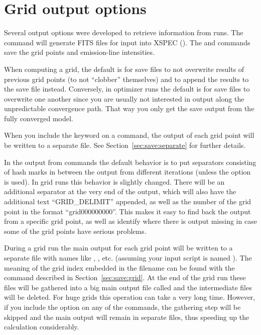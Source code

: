 \section{Grid output options}
\label{sec:GridOutputOptions}

Several  output
options were developed to
retrieve information from  runs.
The  command
will generate FITS files for input into XSPEC (\citealp{Porter2006}).
The
 and  commands
save the grid points and emission-line intensities.

When computing a grid, the default is for save files to not overwrite
results of previous grid points (to not ``clobber'' themselves) and
to append the results to the save file instead.
Conversely, in optimizer runs the default
is for save files to overwrite one another since you
are usually not interested in output along the unpredictable convergence path.
That way you only get the save output from the fully converged model.

When you include the  keyword on a 
command, the output of each grid point will be written to a separate file. See
Section~\ref{sec:save:separate} for further details.

In the output from  commands the default behavior is to put
separators consisting of hash marks in between the output from different
iterations (unless the  option is used). In grid runs this
behavior is slightly changed. There will be an additional separator at the
very end of the output, which will also have the additional text
``GRID\_DELIMIT'' appended, as well as the number of the grid point in the
format ``grid000000000''. This makes it easy to find back the output from a
specific grid point, as well as identify where there is output missing in case
some of the grid points have serious problems.

During a grid run the main output for each grid point will be written to a
separate file with names like ,
, etc. (assuming your input script
is named ). The meaning of the grid index embedded
in the filename can be found with the  command described
in Section~\ref{sec:save:grid}. At the end of the grid run these files will be
gathered into a big main output file called  and
the intermediate files will be deleted. For huge grids this operation can take
a very long time. However, if you include the  option on
any of the  commands, the gathering step will be skipped and
the main output will remain in separate files, thus speeding up the
calculation considerably.

